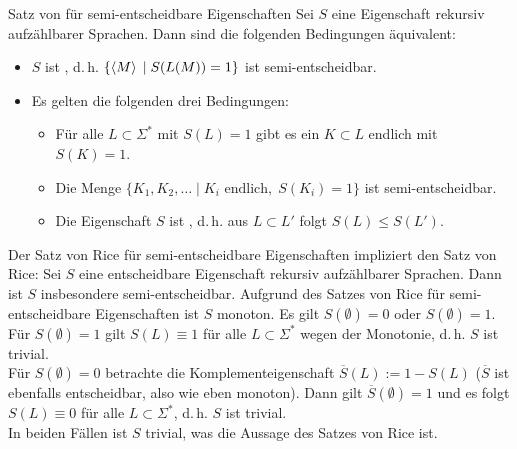 \linie
\pagebreak

\begin{Satz}{Satz von  für semi-entscheidbare Eigenschaften}
    Sei $S$ eine Eigenschaft rekursiv aufzählbarer Sprachen.
    Dann sind die folgenden Bedingungen äquivalent:
    \begin{itemize}
        \item
        $S$ ist , d.\,h.
        $\{\left\langle M\right\rangle \;|\; S(L(M)) = 1\}$ ist semi-entscheidbar.

        \item
        Es gelten die folgenden drei Bedingungen:
        \begin{itemize}
            \item
            Für alle $L \subset \Sigma^\ast$ mit $S(L) = 1$ gibt es ein $K \subset L$ endlich mit
            $S(K) = 1$.

            \item
            Die Menge $\{K_1, K_2, \dotsc \;|\; K_i \text{ endlich},\; S(K_i) = 1\}$ ist
            semi-entscheidbar.

            \item
            Die Eigenschaft $S$ ist , d.\,h. aus $L \subset L'$ folgt
            $S(L) \le S(L')$.
        \end{itemize}
    \end{itemize}
\end{Satz}

\linie

\begin{Bem}
    Der Satz von Rice für semi-entscheidbare Eigenschaften impliziert den Satz von Rice:
    Sei $S$ eine entscheidbare Eigenschaft rekursiv aufzählbarer Sprachen.
    Dann ist $S$ insbesondere semi-entscheidbar.
    Aufgrund des Satzes von Rice für semi-entscheidbare Eigenschaften ist $S$ monoton.
    Es gilt $S(\emptyset) = 0$ oder $S(\emptyset) = 1$.\\
    Für $S(\emptyset) = 1$ gilt $S(L) \equiv 1$ für alle $L \subset \Sigma^\ast$
    wegen der Monotonie, d.\,h. $S$ ist trivial.\\
    Für $S(\emptyset) = 0$ betrachte die Komplementeigenschaft $\overline{S}(L) := 1 - S(L)$
    ($\overline{S}$ ist ebenfalls entscheidbar, also wie eben monoton).
    Dann gilt $\overline{S}(\emptyset) = 1$ und es folgt $S(L) \equiv 0$ für alle
    $L \subset \Sigma^\ast$, d.\,h. $S$ ist trivial.\\
    In beiden Fällen ist $S$ trivial, was die Aussage des Satzes von Rice ist.
\end{Bem}

